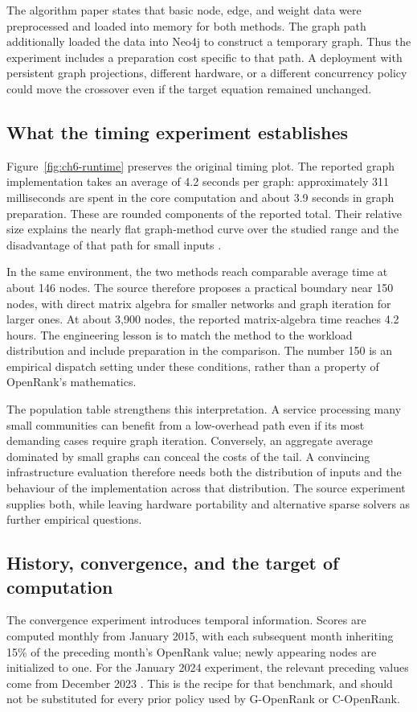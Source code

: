 The algorithm paper states that basic node, edge, and weight data were preprocessed and loaded into memory for both methods. The graph path additionally loaded the data into Neo4j to construct a temporary graph. Thus the experiment includes a preparation cost specific to that path. A deployment with persistent graph projections, different hardware, or a different concurrency policy could move the crossover even if the target equation remained unchanged.

\subsection{What the timing experiment establishes}
Figure~\ref{fig:ch6-runtime} preserves the original timing plot. The reported graph implementation takes an average of 4.2 seconds per graph: approximately 311 milliseconds are spent in the core computation and about 3.9 seconds in graph preparation. These are rounded components of the reported total. Their relative size explains the nearly flat graph-method curve over the studied range and the disadvantage of that path for small inputs \citep[Section 4.5]{han2026rank}.



In the same environment, the two methods reach comparable average time at about 146 nodes. The source therefore proposes a practical boundary near 150 nodes, with direct matrix algebra for smaller networks and graph iteration for larger ones. At about 3,900 nodes, the reported matrix-algebra time reaches 4.2 hours. The engineering lesson is to match the method to the workload distribution and include preparation in the comparison. The number 150 is an empirical dispatch setting under these conditions, rather than a property of OpenRank's mathematics.

The population table strengthens this interpretation. A service processing many small communities can benefit from a low-overhead path even if its most demanding cases require graph iteration. Conversely, an aggregate average dominated by small graphs can conceal the costs of the tail. A convincing infrastructure evaluation therefore needs both the distribution of inputs and the behaviour of the implementation across that distribution. The source experiment supplies both, while leaving hardware portability and alternative sparse solvers as further empirical questions.

\subsection{History, convergence, and the target of computation}
The convergence experiment introduces temporal information. Scores are computed monthly from January 2015, with each subsequent month inheriting 15\% of the preceding month's OpenRank value; newly appearing nodes are initialized to one. For the January 2024 experiment, the relevant preceding values come from December 2023 \citep[Section 4.4]{han2026rank}. This is the recipe for that benchmark, and should not be substituted for every prior policy used by G-OpenRank or C-OpenRank.

